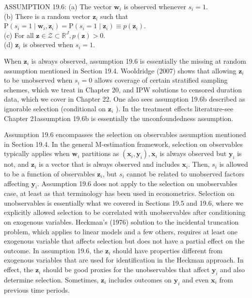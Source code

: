 \documentclass[10pt]{article}
\begin{document}
ASSUMPTION 19.6: (a) The vector $\mathbf{w}_{i}$ is observed whenever $s_{i}=1$.\\
(b) There is a random vector $\mathbf{z}_{i}$ such that $\mathrm{P}\left(s_{i}=1 \mid \mathbf{w}_{i}, \mathbf{z}_{i}\right)=\mathrm{P}\left(s_{i}=1 \mid \mathbf{z}_{i}\right) \equiv p\left(\mathbf{z}_{i}\right)$.\\
(c) For all $\mathbf{z} \in \mathscr{Z} \subset \mathbb{R}^{J}, p(\mathbf{z})>0$.\\
(d) $\mathbf{z}_{i}$ is observed when $s_{i}=1$.

When $\mathbf{z}_{i}$ is always observed, assumption 19.6 is essentially the missing at random assumption mentioned in Section 19.4. Wooldridge (2007) shows that allowing $\mathbf{z}_{i}$ to be unobserved when $s_{i}=0$ allows coverage of certain stratified sampling schemes, which we treat in Chapter 20, and IPW solutions to censored duration data, which we cover in Chapter 22. One also sees assumption 19.6b described as ignorable selection (conditional on $\mathbf{z}_{i}$ ). In the treatment effects literature-see Chapter 21assumption 19.6b is essentially the unconfoundedness assumption.

Assumption 19.6 encompasses the selection on observables assumption mentioned in Section 19.4. In the general M-estimation framework, selection on observables typically applies when $\mathbf{w}_{i}$ partitions as $\left(\mathbf{x}_{i}, \mathbf{y}_{i}\right), \mathbf{x}_{i}$ is always observed but $\mathbf{y}_{i}$ is not, and $\mathbf{z}_{i}$ is a vector that is always observed and includes $\mathbf{x}_{i}$. Then, $s_{i}$ is allowed to be a function of observables $\mathbf{z}_{i}$, but $s_{i}$ cannot be related to unobserved factors affecting $\mathbf{y}_{i}$. Assumption 19.6 does not apply to the selection on unobservables case, at least as that terminology has been used in econometrics. Selection on unobservables is essentially what we covered in Sections 19.5 and 19.6, where we explicitly allowed selection to be correlated with unobservables after conditioning on exogenous variables. Heckman's (1976) solution to the incidental truncation problem, which applies to linear models and a few others, requires at least one exogenous variable that affects selection but does not have a partial effect on the outcome. In assumption 19.6, the $\mathbf{z}_{i}$ should have properties different from exogenous variables that are used for identification in the Heckman approach. In effect, the $\mathbf{z}_{i}$ should be good proxies for the unobservables that affect $\mathbf{y}_{i}$ and also determine selection. Sometimes, $\mathbf{z}_{i}$ includes outcomes on $\mathbf{y}_{i}$ and even $\mathbf{x}_{i}$ from previous time periods.
\end{document}
